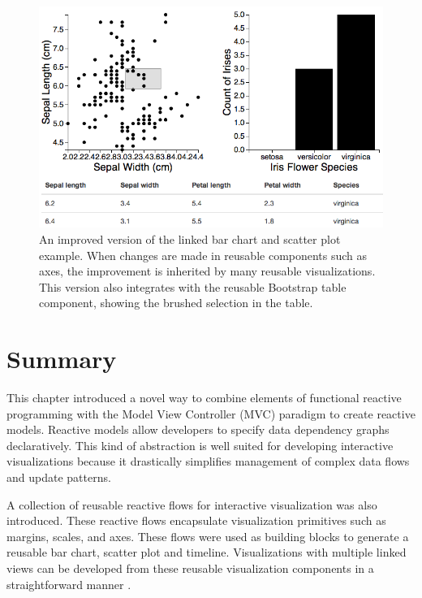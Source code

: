 


\begin{figure}
  \centering
  \includegraphics[width=\figureWidth]{figs/linkedViewsNew.png}
  \caption [Improved Linked Bar Chart, Scatter Plot and Table]{An improved version of the linked bar chart and scatter plot example. When changes are made in reusable components such as axes, the improvement is inherited by many reusable visualizations. This version also integrates with the reusable Bootstrap table component, showing the brushed selection in the table.}
  \label{fig:linkedViewsNew}
\end{figure}

\section{Summary}
This chapter introduced a novel way to combine elements of functional reactive programming with the Model View Controller (MVC) paradigm to create reactive models. Reactive models allow developers to specify data dependency graphs declaratively. This kind of abstraction is well suited for developing interactive visualizations because it drastically simplifies management of complex data flows and update patterns.

A collection of reusable reactive flows for interactive visualization was also introduced. These reactive flows encapsulate visualization primitives such as margins, scales, and axes. These flows were used as building blocks to generate a reusable bar chart, scatter plot and timeline. Visualizations with multiple linked views can be developed from these reusable visualization components in a straightforward manner .

